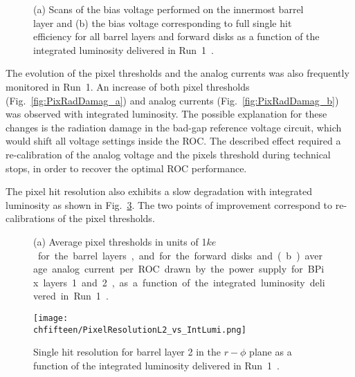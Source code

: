 \begin{figure}[!htb]
 \begin{center}
 \end{center}
 \caption{(a) Scans of the bias voltage performed on the innermost barrel layer and (b) the bias voltage corresponding to full single hit efficiency for all barrel layers and forward disks as a function of the integrated luminosity delivered in Run~1~\cite{PixelOffline}.}
 \label{fig:PixBiasV}
\end{figure}

The evolution of the pixel thresholds and the analog currents was also frequently monitored in Run~1.
An increase of both pixel thresholds (Fig.~\ref{fig:PixRadDamag_a}) and analog currents (Fig.~\ref{fig:PixRadDamag_b}) was observed with integrated luminosity.
The possible explanation for these changes is the radiation damage in the bad-gap reference voltage circuit, which would shift all voltage settings inside the ROC.
The described effect required a re-calibration of the analog voltage and the pixels threshold during technical stops, in order to recover the optimal ROC performance.

The pixel hit resolution also exhibits a slow degradation with integrated luminosity as shown in Fig.~\ref{fig:PixRelvsLumi}. The two points of improvement correspond to re-calibrations of the pixel thresholds.

\begin{figure}[!htb]
 \begin{center}
 \end{center}
 \caption{(a) Average pixel thresholds in units of 1\unit{$ke$} for the barrel layers, and for the forward disks and (b) average analog current per ROC drawn by the power supply for BPix layers 1 and 2, as a function of the integrated luminosity delivered in Run~1~\cite{PixelOffline}.}
 \label{fig:PixRadDamag}
\end{figure}

\begin{figure}[!htb]
 \begin{center}
 \texttt{[image: \\chfifteen/PixelResolutionL2\_vs\_IntLumi.png]}
 \end{center}
 \caption{Single hit resolution for barrel layer 2 in the $r-\phi$ plane as a function of the integrated luminosity delivered in Run~1~\cite{PixelOffline}.}
 \label{fig:PixRelvsLumi}
\end{figure}

